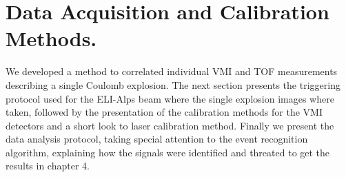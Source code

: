 \chapter{ Data Acquisition and Calibration Methods.}

We developed a method to correlated individual VMI and TOF measurements describing a single Coulomb explosion. The next section presents the triggering protocol used for the ELI-Alps beam where the single explosion images where taken, followed by the presentation of the calibration methods for the VMI detectors and a short look to laser calibration method. Finally we present the data analysis protocol, taking special attention to the event recognition algorithm, explaining how the signals were identified and threated to get the results in chapter 4.


